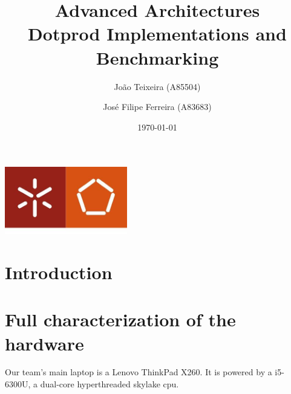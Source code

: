 \documentclass[a4paper]{report}
\begin{document}
\title{Advanced Architectures\\Dotprod Implementations and Benchmarking}
\author{João Teixeira (A85504) \and José Filipe Ferreira (A83683)}
\date{\today}

\begin{center}
    \begin{minipage}{0.75\linewidth}
        \centering
        \includegraphics[width=0.4\textwidth]{images/eng.jpeg}\par\vspace{1cm}
        \vspace{1.5cm}
        \href{https://www.uminho.pt/PT}
        {\color{black}{\scshape\LARGE Universidade do Minho}} \par
        \vspace{1cm}
        \href{https://www.di.uminho.pt/}
        {\color{black}{\scshape\Large Departamento de Informática}} \par
        \vspace{1.5cm}
        \maketitle
    \end{minipage}
\end{center}

\tableofcontents

\pagebreak

\chapter{Introduction}

\chapter{Full characterization of the hardware}
Our team's main laptop is a Lenovo ThinkPad X260. It is powered by a i5-6300U, a
dual-core hyperthreaded skylake cpu.
\end{document}
